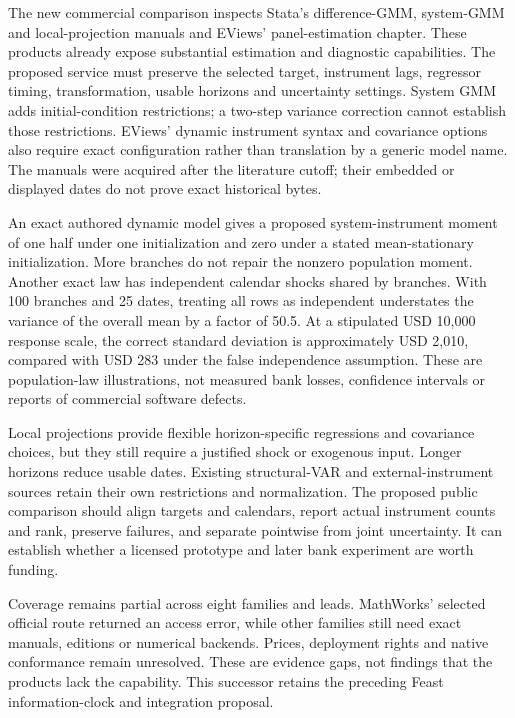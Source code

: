 The new commercial comparison inspects Stata's difference-GMM,
system-GMM and local-projection manuals and EViews' panel-estimation
chapter. These products already expose substantial estimation and
diagnostic capabilities. The proposed service must preserve the selected
target, instrument lags, regressor timing, transformation, usable
horizons and uncertainty settings. System GMM adds initial-condition
restrictions; a two-step variance correction cannot establish those
restrictions. EViews' dynamic instrument syntax and covariance options
also require exact configuration rather than translation by a generic
model name. The manuals were acquired after the literature cutoff; their
embedded or displayed dates do not prove exact historical bytes.
\citep{exec19_dynamic_stata_ab,exec19_dynamic_stata_system,
exec19_dynamic_stata_lp,exec19_dynamic_eviews_panel}

An exact authored dynamic model gives a proposed system-instrument
moment of one half under one initialization and zero under a stated
mean-stationary initialization. More branches do not repair the nonzero
population moment. Another exact law has independent calendar shocks
shared by branches. With 100 branches and 25 dates, treating all rows as
independent understates the variance of the overall mean by a factor of
50.5. At a stipulated USD 10,000 response scale, the correct standard
deviation is approximately USD 2,010, compared with USD 283 under the
false independence assumption. These are population-law illustrations,
not measured bank losses, confidence intervals or reports of commercial
software defects. \citep{exec19_dynamic_reference}

Local projections provide flexible horizon-specific regressions and
covariance choices, but they still require a justified shock or
exogenous input. Longer horizons reduce usable dates. Existing
structural-VAR and external-instrument sources retain their own
restrictions and normalization. The proposed public comparison should
align targets and calendars, report actual instrument counts and rank,
preserve failures, and separate pointwise from joint uncertainty. It can
establish whether a licensed prototype and later bank experiment are
worth funding. \citep{exec19_dynamic_stata_lp,
exec13_ct_stata_svar,exec13_ct_stata_ivsvar}

Coverage remains partial across eight families and leads. MathWorks'
selected official route returned an access error, while other families
still need exact manuals, editions or numerical backends. Prices,
deployment rights and native conformance remain unresolved. These are
evidence gaps, not findings that the products lack the capability. This
successor retains the preceding Feast information-clock and integration
proposal. \citep{sp19feast_reader,sp19feast_progress}

